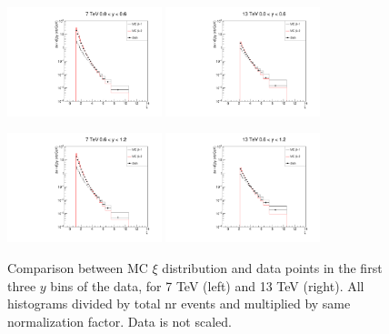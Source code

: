 \documentclass{article}
\begin{document}
\begin{figure}[h!]
\centering
\includegraphics[width = 0.4\textwidth]{xi_7_y1.pdf}
\includegraphics[width = 0.4\textwidth]{xi_13_y1.pdf}

\includegraphics[width = 0.4\textwidth]{xi_7_y2.pdf}
\includegraphics[width = 0.4\textwidth]{xi_13_y2.pdf}
\caption{Comparison between MC $\xi$ distribution and data points in the first three $y$ bins of the data, for 7 TeV (left) and 13 TeV (right). All histograms divided by total nr events and multiplied by same normalization factor. Data is not scaled.}\label{f:xi_comp_1}
\end{figure}

\clearpage
\end{document}
